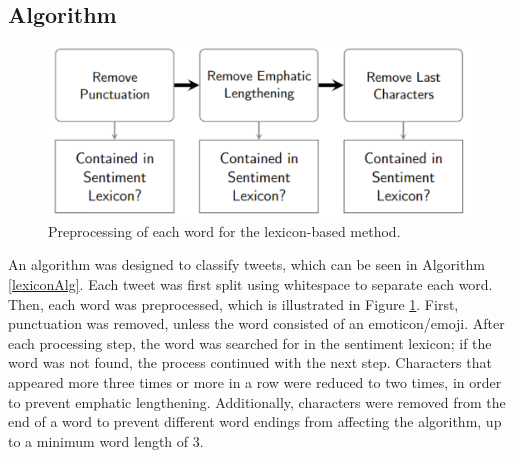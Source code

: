 \subsection{Algorithm}

\begin{figure}
    \centering

    \includegraphics[scale=0.65]{Images/lexicon.png}

   \caption{Preprocessing of each word for the lexicon-based method.}
    \label{fig:lex_preprocess}
\end{figure}

An algorithm was designed to classify tweets, which can be seen in Algorithm \ref{lexiconAlg}. Each tweet was first split using whitespace to separate each word. Then, each word was preprocessed, which is illustrated in Figure \ref{fig:lex_preprocess}. First, punctuation was removed, unless the word consisted of an emoticon/emoji. After each processing step, the word was searched for in the sentiment lexicon; if the word was not found, the process continued with the next step. Characters that appeared more three times or more in a row were reduced to two times, in order to prevent emphatic lengthening. Additionally, characters were removed from the end of a word to prevent different word endings from affecting the algorithm, up to a minimum word length of 3.

